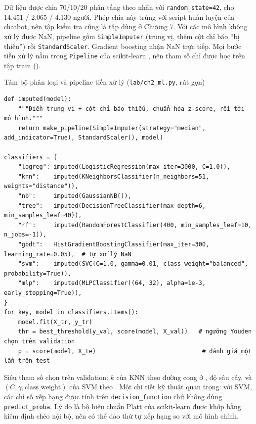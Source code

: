 Dữ liệu được chia 70/10/20 phân tầng theo nhãn với \texttt{random\_state=42}, cho 14.451 / 2.065 / 4.130 người. Phép chia này trùng với script huấn luyện của chatbot, nên tập kiểm tra cũng là tập dùng ở Chương 7. Với các mô hình không xử lý được NaN, pipeline gồm \texttt{SimpleImputer} (trung vị, thêm cột chỉ báo ``bị thiếu'') rồi \texttt{StandardScaler}. Gradient boosting nhận NaN trực tiếp. Mọi bước tiền xử lý nằm trong \texttt{Pipeline} của scikit-learn \cite{pedregosa2011}, nên tham số chỉ được học trên tập train ().

\begin{code}{Tám bộ phân loại và pipeline tiền xử lý (\texttt{lab/ch2\_ml.py}, rút gọn)}
\label{lst:ch2-pipe}
\begin{verbatim}
def imputed(model):
    """Điền trung vị + cột chỉ báo thiếu, chuẩn hóa z-score, rồi tới mô hình."""
    return make_pipeline(SimpleImputer(strategy="median", add_indicator=True), StandardScaler(), model)

classifiers = {
    "logreg": imputed(LogisticRegression(max_iter=3000, C=1.0)),
    "knn":    imputed(KNeighborsClassifier(n_neighbors=51, weights="distance")),
    "nb":     imputed(GaussianNB()),
    "tree":   imputed(DecisionTreeClassifier(max_depth=6, min_samples_leaf=40)),
    "rf":     imputed(RandomForestClassifier(400, min_samples_leaf=10, n_jobs=-1)),
    "gbdt":   HistGradientBoostingClassifier(max_iter=300, learning_rate=0.05),  # tự xử lý NaN
    "svm":    imputed(SVC(C=1.0, gamma=0.01, class_weight="balanced", probability=True)),
    "mlp":    imputed(MLPClassifier((64, 32), alpha=1e-3, early_stopping=True)),
}
for key, model in classifiers.items():
    model.fit(X_tr, y_tr)
    thr = best_threshold(y_val, score(model, X_val))   # ngưỡng Youden chọn trên validation
    p = score(model, X_te)                              # đánh giá một lần trên test
\end{verbatim}
\end{code}

Siêu tham số chọn trên validation: $k$ của KNN theo đường cong ở , độ sâu cây, và $(C,\gamma,\text{class\_weight})$ của SVM theo . Một chi tiết kỹ thuật quan trọng: với SVM, các chỉ số xếp hạng được tính trên \texttt{decision\_function} chứ không dùng \texttt{predict\_proba}. Lý do là bộ hiệu chuẩn Platt của scikit-learn được khớp bằng kiểm định chéo nội bộ, nên có thể đảo thứ tự xếp hạng so với mô hình chính.

